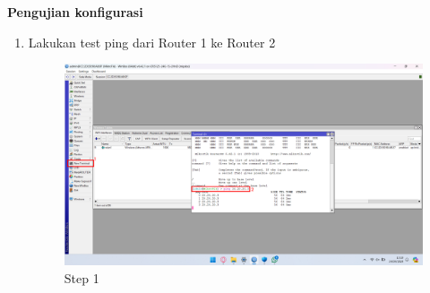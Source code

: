 \begin{center}
	\textbf{Pengujian konfigurasi}
	\begin{enumerate}
		\item Lakukan test ping dari Router 1 ke Router 2
		      \begin{figure}[H]
			      \centering
			      \includegraphics[width=0.9\linewidth]{P1/img/per2/pc1/Step 4.png}
			      \caption{Step 1}
			      \label{fig:Ping Step 1(Per.2 PC1)}
		      \end{figure}
	\end{enumerate}

\end{center}

